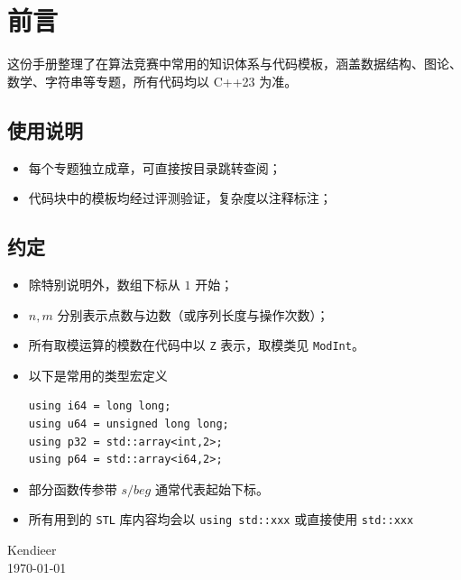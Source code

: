 \chapter*{前言}

这份手册整理了在算法竞赛中常用的知识体系与代码模板，涵盖数据结构、图论、数学、字符串等专题，所有代码均以 C++23 为准。

\section*{使用说明}

\begin{itemize}[leftmargin=2em]
    \item 每个专题独立成章，可直接按目录跳转查阅；
    \item 代码块中的模板均经过评测验证，复杂度以注释标注；
\end{itemize}

\section*{约定}

\begin{itemize}[leftmargin=2em]
    \item 除特别说明外，数组下标从 $1$ 开始；
    \item $n, m$ 分别表示点数与边数（或序列长度与操作次数）；
    \item 所有取模运算的模数在代码中以 \texttt{Z} 表示，取模类见 \texttt{ModInt}。
    \item 以下是常用的类型宏定义 \begin{lstlisting}
using i64 = long long;
using u64 = unsigned long long;
using p32 = std::array<int,2>;
using p64 = std::array<i64,2>;
    \end{lstlisting}
    \item 部分函数传参带 $s/beg$ 通常代表起始下标。
    \item 所有用到的 \texttt{STL} 库内容均会以 \verb|using std::xxx| 或直接使用 \verb|std::xxx|
\end{itemize}

\vspace{2em}

\begin{flushright}
    Kendieer\\
    \today
\end{flushright}
